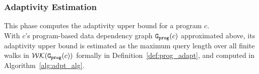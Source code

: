 \subsubsection{Adaptivity Estimation}
\label{sec:static-adapt-comput}
This phase computes the adaptivity upper bound for a program $c$.
\\
With
$c$'s program-based data dependency graph $\mathtt{{G_{prog}}}({c})$ approximated above,
%
its adaptivity upper bound 
%
is estimated as
the maximum query length over all finite walks in $\mathcal{WK}(\mathtt{{G_{prog}}}({c}))$ formally in Definition~\ref{def:prog_adapt}, 
and computed 
in Algorithm~\ref{alg:adpt_alg}.
%
%

